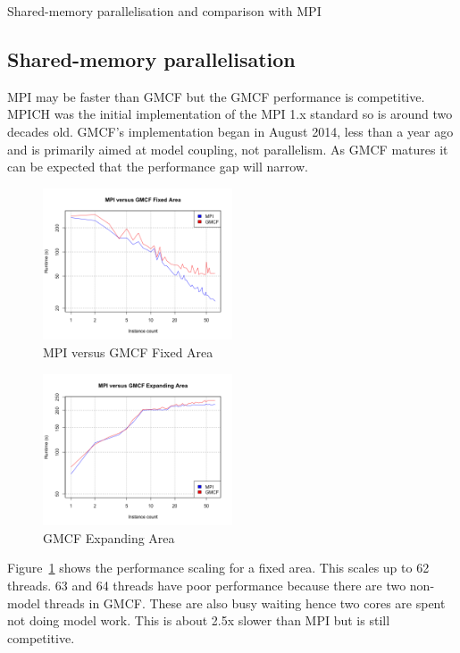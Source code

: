 Shared-memory parallelisation and comparison with MPI

\subsection{Shared-memory parallelisation}

MPI may be faster than GMCF but the GMCF performance is competitive. MPICH was
the initial implementation of the MPI 1.x standard so is around two decades old.
GMCF's implementation began in August 2014, less than a year ago and is
primarily aimed at model coupling, not parallelism. As GMCF matures it can be
expected that the performance gap will narrow.

\begin{figure}
    \includegraphics[width=0.5\textwidth]{graphs/GMCF-MPI-fixed-area.png}
    \caption{MPI versus GMCF Fixed Area}
    \label{fig:gmcfmpifixedarea}
\end{figure}

\begin{figure}
    \includegraphics[width=0.5\textwidth]{graphs/GMCF-MPI-expanding-area.png}
    \caption{GMCF Expanding Area}
    \label{fig:gmcfexpandingarea}
\end{figure}

Figure~\ref{fig:gmcfmpifixedarea} shows the performance scaling for a fixed
area. This scales up to 62 threads. 63 and 64 threads have poor performance
because there are two non-model threads in GMCF. These are also busy waiting
hence two cores are spent not doing model work. This is about 2.5x slower than
MPI but is still competitive.

